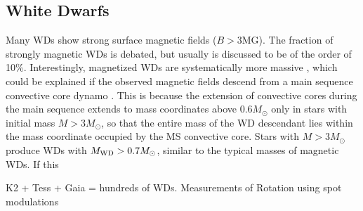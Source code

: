 {\color{red} \subsection{White Dwarfs}}
Many WDs show strong surface magnetic fields ($B>$3MG). The fraction of strongly magnetic WDs is debated, but usually is discussed to be of the order of 10\%. Interestingly, magnetized WDs are systematically more massive \cite{Ferrario_2015}, which could be explained if the observed magnetic fields descend from a main sequence convective core dynamo \cite{Cantiello_2016}. This is because the extension of convective cores during the main sequence extends to mass coordinates above 0.6$M_\odot$ only in stars with initial mass $M>3M_\odot$, so that the entire mass of the WD descendant lies within the mass coordinate occupied by the MS convective core. Stars with $M>3M_\odot$ produce WDs with $M_{\rm WD}>0.7M_\odot$, similar to the typical masses of magnetic WDs. If this 

K2 + Tess + Gaia = hundreds of WDs. Measurements of Rotation using spot modulations